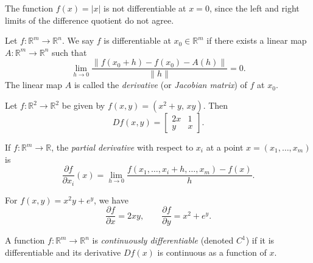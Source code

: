 \begin{example}
The function $f(x)=|x|$ is not differentiable at $x=0$, since the left and right limits of the difference quotient do not agree.
\end{example}


\begin{definition}
Let $f:\mathbb{R}^m\to \mathbb{R}^n$. We say $f$ is differentiable at $x_0\in \mathbb{R}^m$ if there exists a linear map 
$A:\mathbb{R}^m\to \mathbb{R}^n$ such that
\begin{equation}
\lim_{h\to 0}\frac{\|f(x_0+h)-f(x_0)-A(h)\|}{\|h\|} = 0.
\end{equation}
The linear map $A$ is called the \emph{derivative} (or \emph{Jacobian matrix}) of $f$ at $x_0$.
\end{definition}

\begin{example}
Let $f:\mathbb{R}^2\to \mathbb{R}^2$ be given by $f(x,y)=(x^2+y,\, xy)$.  
Then 
\begin{equation}
Df(x,y) = \begin{bmatrix}
2x & 1\\
y & x
\end{bmatrix}.
\end{equation}
\end{example}

\begin{definition}
If $f:\mathbb{R}^m\to \mathbb{R}$, the \emph{partial derivative} with respect to $x_i$ at a point $x=(x_1,\dots,x_m)$ is
\begin{equation}
\frac{\partial f}{\partial x_i}(x) = \lim_{h\to 0} \frac{f(x_1,\dots,x_i+h,\dots,x_m)-f(x)}{h}.
\end{equation}
\end{definition}

\begin{example}
For $f(x,y)=x^2y+e^y$, we have
\begin{equation}
\frac{\partial f}{\partial x} = 2xy, \qquad \frac{\partial f}{\partial y} = x^2+e^y.
\end{equation}
\end{example}

\begin{definition}
A function $f:\mathbb{R}^m\to \mathbb{R}^n$ is \emph{continuously differentiable} (denoted $C^1$) if it is differentiable and its derivative $Df(x)$ is continuous as a function of $x$.
\end{definition}

